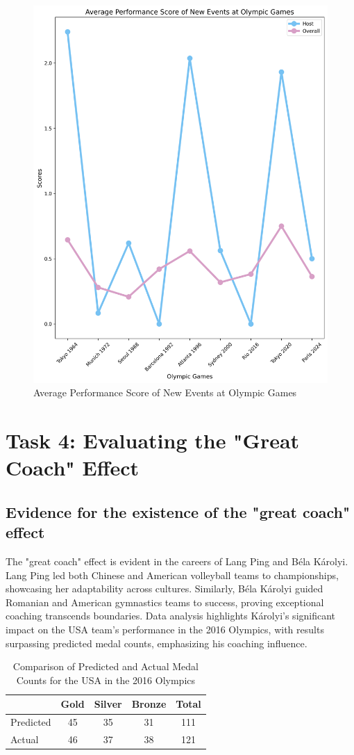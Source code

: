 \documentclass[12pt]{article}  %
\begin{document}
 \begin{figure}[h]
        \centering
        \includegraphics[width=0.5\linewidth]{Performance-Scores-Over-Olympic-Games.png}
        \caption{Average Performance Score of New Events at Olympic Games}
        \label{fig:enter-label}
    \end{figure}


\section{Task 4: Evaluating the "Great Coach" Effect}
\subsection{Evidence for the existence of the "great coach" effect}
The "great coach" effect is evident in the careers of Lang Ping and Béla Károlyi. Lang Ping led both Chinese and American volleyball teams to championships, showcasing her adaptability across cultures. Similarly, Béla Károlyi guided Romanian and American gymnastics teams to success, proving exceptional coaching transcends boundaries. Data analysis highlights Károlyi’s significant impact on the USA team’s performance in the 2016 Olympics, with results surpassing predicted medal counts, emphasizing his coaching influence.
\begin{table}[h!]
\centering
\begin{tabular}{lcccc}
\toprule
\textbf{} & \textbf{Gold} & \textbf{Silver} & \textbf{Bronze} & \textbf{Total} \\
\midrule
Predicted & 45 & 35 & 31 & 111 \\
Actual    & 46 & 37 & 38 & 121 \\
\bottomrule
\end{tabular}
\caption{Comparison of Predicted and Actual Medal Counts for the USA in the 2016 Olympics}
\label{tab:usa_medals_2016}
\end{table}
\end{document}

